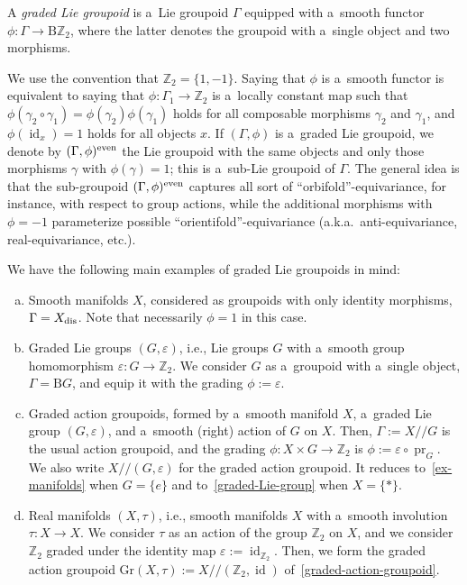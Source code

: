 \documentclass[10pt,a4paper]{amsart}
\numberwithin{equation}{section}
\def\Z {\mathbb{Z}}
\def\act#1#2{#1/\!\!/#2}
\newcommand{\pr}{\operatorname{pr}}
\newcommand{\id}{\operatorname{id}}
\begin{document}
\begin{Definition}
\label{graded-groupoid}
 A \emph{graded Lie groupoid} is a~Lie groupoid $\Gamma$ equipped with a~smooth functor
 $\phi \colon \Gamma \to \mathrm{B}\mathbb{Z}_2$, where the latter denotes the groupoid with a~single object and two morphisms.
\end{Definition}

We use the convention that $\Z_2=\{1,-1\}$. Saying that $\phi$ is a~smooth functor is equivalent to saying that $\phi\colon \Gamma_1 \to \Z_2$ is a~locally constant map such that $\phi(\gamma_2\circ\gamma_1)=\phi(\gamma_2)\phi(\gamma_1)$ holds for all composable morphisms $\gamma_2$ and $\gamma_1$, and $\phi(\id_x)=1$ holds for all objects $x$. If $(\Gamma,\phi)$ is a~graded Lie groupoid, we denote by $(\Gamma,\phi)^{\rm even}$ the Lie groupoid with the same objects and only those morphisms $\gamma$ with $\phi(\gamma)=1$; this is a~sub-Lie groupoid of $\Gamma$.
The general idea is that the sub-groupoid $(\Gamma,\phi)^{\rm even}$ captures all sort of ``orbifold''-equivariance, for instance, with respect to group actions, while the additional morphisms with $\phi=-1$ parameterize possible ``orientifold''-equivariance (a.k.a.\ anti-equivariance, real-equivariance, etc.).

\begin{Example}\label{ex1}
We have the following main examples of graded Lie groupoids in mind:
\begin{enumerate}[(a)]\itemsep=0pt
\item
\label{ex-manifolds}
Smooth manifolds $X$, considered as groupoids with only identity morphisms, $\Gamma=X_{\rm dis}$. Note that necessarily $\phi=1$ in this case.

\item
\label{graded-Lie-group}
Graded Lie groups $(G,\varepsilon)$, i.e., Lie groups $G$ with a~smooth group homomorphism $\varepsilon\colon G \to \Z_2$. We consider $G$ as a~groupoid with a~single object, $\Gamma=\mathrm{B}G$, and equip it with the grading $\phi := \varepsilon$.

\item
\label{graded-action-groupoid}
Graded action groupoids, formed by a~smooth manifold $X$, a~graded Lie group $(G,\varepsilon)$, and a~smooth (right) action of $G$ on $X$. Then, $\Gamma := \act XG$ is the usual action groupoid, and the grading $\phi\colon X \times G \to \Z_2$ is $\phi := \varepsilon \circ \pr_G$. We also write $\act X{(G,\varepsilon)}$ for the graded action groupoid. It reduces to~\ref{ex-manifolds} when $G=\{e\}$ and to~\ref{graded-Lie-group} when $X=\{\ast\}$.

\item
\label{real-manifold}
Real manifolds $(X,\tau)$, i.e., smooth manifolds $X$ with a~smooth involution $\tau\colon X \to X$. We consider $\tau$ as an action of the group $\Z_2$ on $X$, and we consider $\Z_2$ graded under the identity map $\varepsilon:=\id_{\Z_2}$. Then, we form the graded action groupoid $\mathrm{Gr}(X,\tau) :=\act X{(\Z_2,\id)}$ of~\ref{graded-action-groupoid}.
\end{enumerate}
\end{Example}
\end{document}
